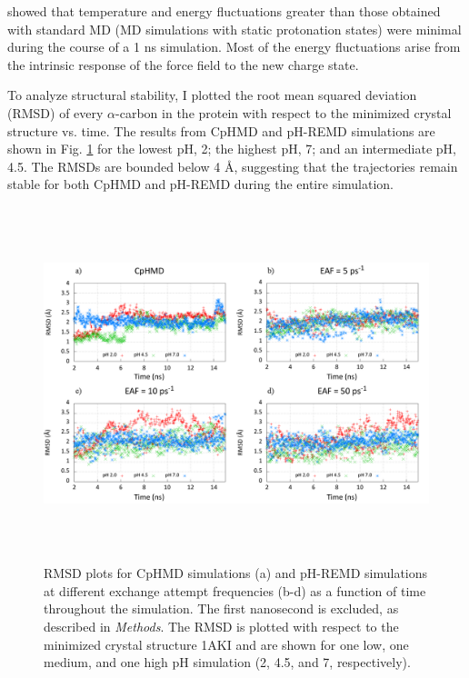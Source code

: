 \citeauthor{Mongan_JComputChem_2004_v25_p2038}
\cite{Mongan_JComputChem_2004_v25_p2038} showed that temperature and energy
fluctuations greater than those obtained with standard MD (\ie MD simulations
with static protonation states) were minimal during the course of a 1 ns
simulation. Most of the energy fluctuations arise from the intrinsic response of
the force field to the new charge state.

To analyze structural stability, I plotted the root mean squared deviation
(RMSD) of every $\alpha$-carbon in the protein with respect to the minimized
crystal structure vs. time. The results from CpHMD and pH-REMD simulations are
shown in Fig. \ref{fig3:RMSD} for the lowest pH, 2; the highest pH, 7; and an
intermediate pH, 4.5. The RMSDs are bounded below 4 \AA, suggesting that the
trajectories remain stable for both CpHMD and pH-REMD during the entire
simulation.

\begin{figure}
 \includegraphics[width=6.5in, height=4.06in]{1AKI_RMSD_Comparison.png}
 \caption[RMSD plots for CpHMD simulations (a) and pH-REMD simulations at
          different exchange attempt frequencies (b-d) as a function of time]
         {RMSD plots for CpHMD simulations (a) and pH-REMD simulations at
          different exchange attempt frequencies (b-d) as a function of time
          throughout the simulation. The first nanosecond is excluded, as
          described in \emph{Methods}. The RMSD is plotted with respect to the
          minimized crystal structure 1AKI and are shown for one low, one
          medium, and one high pH simulation (2, 4.5, and 7, respectively).}
 \label{fig3:RMSD}
\end{figure}

